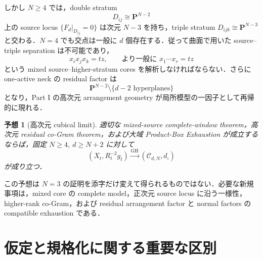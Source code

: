 \documentclass[a4paper,11pt]{ltjsarticle}
\numberwithin{equation}{section}
\theoremstyle{plain}
\newtheorem{conjecture}[theorem]{予想}
\theoremstyle{definition}
\theoremstyle{remark}
\newcommand{\PP}{\mathbf P}
\newcommand{\cC}{\mathcal C}
\newcommand{\GH}{\mathrm{GH}}
\newcommand{\Rt}{R_t}
\begin{document}
しかし \(N\ge4\) では，double stratum
\[
 D_{ij}\cong\PP^{N-2}
\]
上の source locus \(\{F_d|_{D_{ij}}=0\}\) は次元 \(N-3\) を持ち，triple stratum \(D_{ijk}\cong\PP^{N-3}\) と交わる．\(N=4\) でも交点は一般に \(d\) 個存在する．従って曲面で用いた source--triple separation は不可能であり，
\[
 x_ix_jx_k=tz,\qquad
 \text{より一般に }x_1\cdots x_r=tz
\]
という mixed source--higher-stratum cores を解析しなければならない．さらに one-active neck の residual factor は
\[
 \PP^{N-2}\setminus\{d-2\text{ hyperplanes}\}
\]
となり，Part I の高次元 arrangement geometry が局所模型の一因子として再帰的に現れる．

\begin{conjecture}[高次元 cubical limit]
適切な mixed-source complete-window theorem，高次元 residual co-Gram theorem，および大域 Product-Box Exhaustion が成立するならば，固定 \(N\ge4\), \(d\ge N+2\) に対して
\[
 (X_t,\Rt^{-2}g_t)\xrightarrow{\GH}(\cC_{d,N},d_\square)
\]
が成り立つ．
\end{conjecture}

この予想は \(N=3\) の証明を添字だけ変えて得られるものではない．必要な新規事項は，mixed core の complete model，正次元 source locus に沿う一様性，higher-rank co-Gram，および residual arrangement factor と normal factors の compatible exhaustion である．

\section{仮定と規格化に関する重要な区別}
\end{document}
